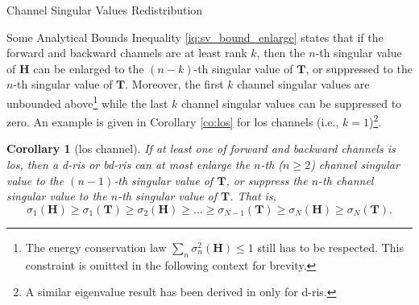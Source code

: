 \documentclass[journal]{IEEEtran}
\newtheorem{corollary}{Corollary}[proposition]
\begin{document}
\begin{section}{Channel Singular Values Redistribution}
\begin{subsection}{Some Analytical Bounds}
		Inequality \eqref{iq:sv_bound_enlarge} states that
		if the forward and backward channels are at least rank $k$, then
		the $n$-th singular value of $\mathbf{H}$ can be enlarged to the $(n-k)$-th singular value of $\mathbf{T}$, or suppressed to the $n$-th singular value of $\mathbf{T}$.
		Moreover, the first $k$ channel singular values are unbounded above\footnote{The energy conservation law $\sum_n \sigma_n^2(\mathbf{H}) \le 1$ still has to be respected. This constraint is omitted in the following context for brevity.} while the last $k$ channel singular values can be suppressed to zero.
		An example is given in Corollary \ref{co:los} for \gls{los} channels (i.e., $k=1$)\footnote{A similar eigenvalue result has been derived in \cite{Semmler2023} only for \gls{d}-\gls{ris}.}.





		\begin{corollary}[\gls{los} channel\label{co:los}]
			If at least one of forward and backward channels is \gls{los}, then a \gls{d}-\gls{ris} or \gls{bd}-\gls{ris} can at most enlarge the $n$-th ($n \ge 2$) channel singular value to the $(n-1)$-th singular value of $\mathbf{T}$, or suppress the $n$-th channel singular value to the $n$-th singular value of $\mathbf{T}$.
			That is,
			\begin{equation}
				\sigma_1(\mathbf{H}) \ge \sigma_1(\mathbf{T}) \ge {\sigma_2(\mathbf{H})} \ge \ldots \ge \sigma_{N-1}(\mathbf{T}) \ge {\sigma_N(\mathbf{H})} \ge \sigma_N(\mathbf{T}).
				\label{iq:sv_bound_los}
			\end{equation}
		\end{corollary}


\end{subsection}
\end{section}
\end{document}
